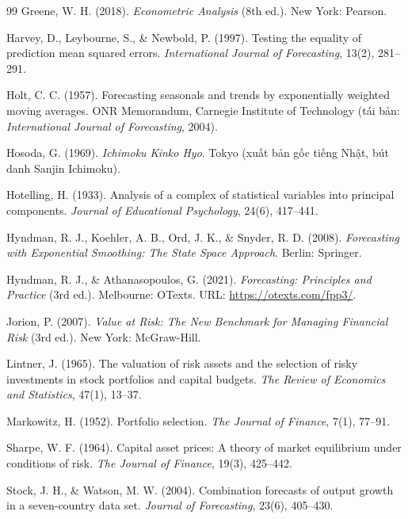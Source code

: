 \documentclass[12pt,a4paper,openany,oneside]{report}
\numberwithin{equation}{chapter}
\begin{document}
\begin{thebibliography}{99}
Greene, W. H. (2018). \emph{Econometric Analysis} (8th ed.). New York:
Pearson.

Harvey, D., Leybourne, S., \& Newbold, P. (1997). Testing the equality
of prediction mean squared errors. \emph{International Journal of
Forecasting}, 13(2), 281--291.

Holt, C. C. (1957). Forecasting seasonals and trends by exponentially
weighted moving averages. ONR Memorandum, Carnegie Institute of
Technology (tái bản: \emph{International Journal of Forecasting}, 2004).

Hosoda, G. (1969). \emph{Ichimoku Kinko Hyo}. Tokyo (xuất bản gốc tiếng
Nhật, bút danh Sanjin Ichimoku).

Hotelling, H. (1933). Analysis of a complex of statistical variables
into principal components. \emph{Journal of Educational Psychology},
24(6), 417--441.

Hyndman, R. J., Koehler, A. B., Ord, J. K., \& Snyder, R. D. (2008).
\emph{Forecasting with Exponential Smoothing: The State Space
Approach}. Berlin: Springer.

Hyndman, R. J., \& Athanasopoulos, G. (2021). \emph{Forecasting:
Principles and Practice} (3rd ed.). Melbourne: OTexts. URL:
\url{https://otexts.com/fpp3/}.

Jorion, P. (2007). \emph{Value at Risk: The New Benchmark for Managing
Financial Risk} (3rd ed.). New York: McGraw-Hill.

Lintner, J. (1965). The valuation of risk assets and the selection of
risky investments in stock portfolios and capital budgets.
\emph{The Review of Economics and Statistics}, 47(1), 13--37.

Markowitz, H. (1952). Portfolio selection. \emph{The Journal of
Finance}, 7(1), 77--91.

Sharpe, W. F. (1964). Capital asset prices: A theory of market
equilibrium under conditions of risk. \emph{The Journal of Finance},
19(3), 425--442.

Stock, J. H., \& Watson, M. W. (2004). Combination forecasts of output
growth in a seven-country data set. \emph{Journal of Forecasting},
23(6), 405--430.


\end{thebibliography}
\end{document}

